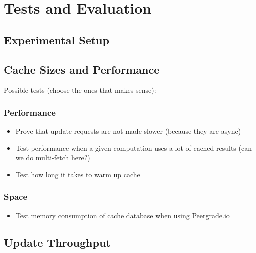 \chapter{Tests and Evaluation}
\label{chapter:tests-and-evaluation}

\section{Experimental Setup}
\label{sec:experimental-setup}


\section{Cache Sizes and Performance}
\label{sec:cache-sizes-and-performance}

Possible tests (choose the ones that makes sense):

\subsection{Performance}
\label{subsec:performance}

\begin{itemize}
  \item Prove that update requests are not made slower (because they are async)
  \item Test performance when a given computation uses a lot of cached results (can we do multi-fetch here?)
  \item Test how long it takes to warm up cache
\end{itemize}


\subsection{Space}
\label{subsec:space}

\begin{itemize}
  \item Test memory consumption of cache database when using Peergrade.io
\end{itemize}


\section{Update Throughput}
\label{sec:update-throughput}

